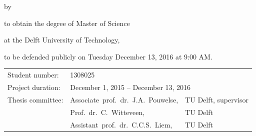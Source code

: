 \begin{titlepage}


\begin{center}


{\makeatletter
\largetitlestyle\fontsize{64}{94}\selectfont\@title
\makeatother}

{\makeatletter
\ifx\@subtitle\undefined\else
    \bigskip
   {\tudsffamily\fontsize{22}{32}\selectfont\@subtitle}    
\fi
\makeatother}

\bigskip
\bigskip

by

\bigskip
\bigskip

{\makeatletter
\largetitlestyle\fontsize{26}{26}\selectfont\@author
\makeatother}

\bigskip
\bigskip

to obtain the degree of Master of Science

at the Delft University of Technology,

to be defended publicly on Tuesday December 13, 2016 at 9:00 AM.

\vfill





\begin{tabular}{lll}
    Student number: & 1308025 \\
    Project duration: & \multicolumn{2}{l}{December 1, 2015 -- December 13, 2016} \\
    Thesis committee: & Associate\ prof.\ dr.\ J.A.\ Pouwelse, & TU Delft, supervisor \\
        & Prof.\ dr.\ C.\ Witteveen, & TU Delft \\
        & Assistant\ prof.\ dr.\ C.C.S.\ Liem, & TU Delft
\end{tabular}


\end{center}
\end{titlepage}
